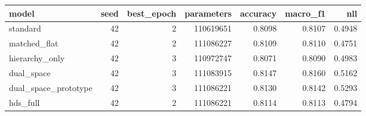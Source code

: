 \begin{tabular}{lrrrrrr}
\toprule
model & seed & best\_epoch & parameters & accuracy & macro\_f1 & nll \\
\midrule
standard & 42 & 2 & 110619651 & 0.8098 & 0.8107 & 0.4948 \\
matched\_flat & 42 & 2 & 111086227 & 0.8109 & 0.8110 & 0.4751 \\
hierarchy\_only & 42 & 3 & 110972747 & 0.8071 & 0.8090 & 0.4983 \\
dual\_space & 42 & 3 & 111083915 & 0.8147 & 0.8160 & 0.5162 \\
dual\_space\_prototype & 42 & 3 & 111086221 & 0.8130 & 0.8142 & 0.5293 \\
hds\_full & 42 & 2 & 111086221 & 0.8114 & 0.8113 & 0.4794 \\
\bottomrule
\end{tabular}
